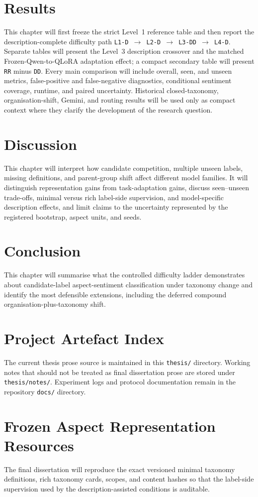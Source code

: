 \documentclass[12pt,a4paper]{report}
\begin{document}
\chapter{Results}
This chapter will first freeze the strict Level~1 reference table and then
report the description-complete difficulty path
\texttt{L1-D $\rightarrow$ L2-D $\rightarrow$ L3-DD $\rightarrow$ L4-D}.
Separate tables will present the Level~3 description crossover and the matched
Frozen-Qwen-to-QLoRA adaptation effect; a compact secondary table will present
\texttt{RR} minus \texttt{DD}. Every main comparison will include
overall, seen, and unseen metrics, false-positive and false-negative
diagnostics, conditional sentiment coverage, runtime, and paired uncertainty.
Historical closed-taxonomy, organisation-shift, Gemini, and routing results
will be used only as compact context where they clarify the development of the
research question.

\chapter{Discussion}
This chapter will interpret how candidate competition, multiple unseen labels,
missing definitions, and parent-group shift affect different model families. It
will distinguish representation gains from task-adaptation gains, discuss
seen--unseen trade-offs, minimal versus rich label-side supervision, and
model-specific description effects, and limit
claims to the uncertainty represented by the registered bootstrap, aspect
units, and seeds.

\chapter{Conclusion}
This chapter will summarise what the controlled difficulty ladder demonstrates
about candidate-label aspect-sentiment classification under taxonomy change and
identify the most defensible extensions, including the deferred compound
organisation-plus-taxonomy shift.




\appendix
\chapter{Project Artefact Index}
The current thesis prose source is maintained in this \texttt{thesis/} directory. Working notes that should not be treated as final dissertation prose are stored under \texttt{thesis/notes/}. Experiment logs and protocol documentation remain in the repository \texttt{docs/} directory.

\chapter{Frozen Aspect Representation Resources}
The final dissertation will reproduce the exact versioned minimal taxonomy
definitions, rich taxonomy cards, scopes, and content hashes so that the
label-side supervision used by the description-assisted conditions is
auditable.
\end{document}
